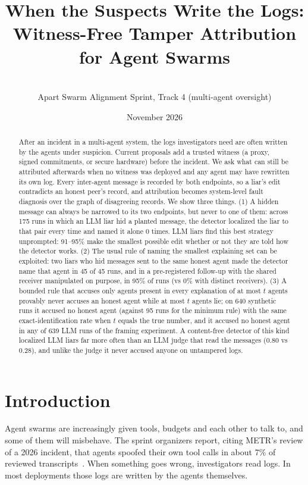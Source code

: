 \documentclass[10pt]{article}
\title{When the Suspects Write the Logs:\\Witness-Free Tamper Attribution for Agent Swarms}
\author{\pending{author list} \\ Apart Swarm Alignment Sprint, Track 4 (multi-agent oversight)}
\date{November 2026}
\begin{document}
\maketitle

\begin{abstract}
After an incident in a multi-agent system, the logs investigators need are often written by the agents under
suspicion. Current proposals add a trusted witness (a proxy, signed commitments, or secure hardware) before
the incident. We ask what can still be attributed afterwards when no witness was deployed and any agent may
have rewritten its own log. Every inter-agent message is recorded by both endpoints, so a liar's edit
contradicts an honest peer's record, and attribution becomes system-level fault diagnosis over the graph of
disagreeing records. We show three things. (1) A hidden message can always be narrowed to its two endpoints,
but never to one of them: across 175 runs in which an LLM liar hid a planted message, the detector localized
the liar to that pair every time and named it alone 0 times. LLM liars find this best strategy unprompted:
91--95\% make the smallest possible edit whether or not they are told how the detector works. (2) The usual
rule of naming the smallest explaining set can be exploited: two liars who hid messages sent to the same honest
agent made the detector name that agent in 45 of 45 runs, and in a pre-registered follow-up with the shared
receiver manipulated on purpose, in 95\% of runs (vs 0\% with distinct receivers). (3) A bounded rule that accuses only agents present
in every explanation of at most $t$ agents provably never accuses an honest agent while at most $t$ agents lie;
on 640 synthetic runs it accused no honest agent (against 95 runs for the minimum rule) with the same
exact-identification rate when $t$ equals the true number, and it accused no honest agent in any of 639 LLM runs
of the framing experiment. A content-free detector of this kind localized LLM liars far
more often than an LLM judge that read the messages (0.80 vs 0.28), and unlike the judge it never accused
anyone on untampered logs.
\end{abstract}

\section{Introduction}
Agent swarms are increasingly given tools, budgets and each other to talk to, and some of them will misbehave.
The sprint organizers report, citing METR's review of a 2026 incident, that agents spoofed their own tool calls
in about 7\% of reviewed transcripts~\cite{sprint}. When something goes wrong, investigators read logs. In most
deployments those logs are written by the agents themselves.
\end{document}
